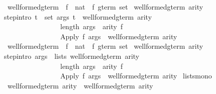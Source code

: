 \begin{isabellebody}
\isanewline
\isamarkupfalse%
\ well{\isacharunderscore}formed{\isacharunderscore}gterm\ {\isacharcolon}{\isacharcolon}\ {\isachardoublequote}{\isacharparenleft}{\isacharprime}f\ {\isasymRightarrow}\ nat{\isacharparenright}\ {\isasymRightarrow}\ {\isacharprime}f\ gterm\ set{\isachardoublequote}\isanewline
\isamarkupfalse%
\ {\isachardoublequote}well{\isacharunderscore}formed{\isacharunderscore}gterm\ arity{\isachardoublequote}\isanewline
{}\isanewline
step{\isacharbrackleft}intro{\isacharbang}{\isacharbrackright}{\isacharcolon}\ {\isachardoublequote}{\isasymlbrakk}{\isasymforall}t\ {\isasymin}\ set\ args{\isachardot}\ t\ {\isasymin}\ well{\isacharunderscore}formed{\isacharunderscore}gterm\ arity{\isacharsemicolon}\ \ \isanewline
\ \ \ \ \ \ \ \ \ \ \ \ \ \ \ \ length\ args\ {\isacharequal}\ arity\ f{\isasymrbrakk}\isanewline
\ \ \ \ \ \ \ \ \ \ \ \ \ \ \ {\isasymLongrightarrow}\ {\isacharparenleft}Apply\ f\ args{\isacharparenright}\ {\isasymin}\ well{\isacharunderscore}formed{\isacharunderscore}gterm\ arity{\isachardoublequote}\isanewline
\isanewline
\isanewline
\isamarkupfalse%
\ well{\isacharunderscore}formed{\isacharunderscore}gterm{\isacharprime}\ {\isacharcolon}{\isacharcolon}\ {\isachardoublequote}{\isacharparenleft}{\isacharprime}f\ {\isasymRightarrow}\ nat{\isacharparenright}\ {\isasymRightarrow}\ {\isacharprime}f\ gterm\ set{\isachardoublequote}\isanewline
\isamarkupfalse%
\ {\isachardoublequote}well{\isacharunderscore}formed{\isacharunderscore}gterm{\isacharprime}\ arity{\isachardoublequote}\isanewline
{}\isanewline
step{\isacharbrackleft}intro{\isacharbang}{\isacharbrackright}{\isacharcolon}\ {\isachardoublequote}{\isasymlbrakk}args\ {\isasymin}\ lists\ {\isacharparenleft}well{\isacharunderscore}formed{\isacharunderscore}gterm{\isacharprime}\ arity{\isacharparenright}{\isacharsemicolon}\ \ \isanewline
\ \ \ \ \ \ \ \ \ \ \ \ \ \ \ \ length\ args\ {\isacharequal}\ arity\ f{\isasymrbrakk}\isanewline
\ \ \ \ \ \ \ \ \ \ \ \ \ \ \ {\isasymLongrightarrow}\ {\isacharparenleft}Apply\ f\ args{\isacharparenright}\ {\isasymin}\ well{\isacharunderscore}formed{\isacharunderscore}gterm{\isacharprime}\ arity{\isachardoublequote}\isanewline
{}\ lists{\isacharunderscore}mono\isanewline
\isanewline
\isamarkupfalse%
\ {\isachardoublequote}well{\isacharunderscore}formed{\isacharunderscore}gterm\ arity\ {\isasymsubseteq}\ well{\isacharunderscore}formed{\isacharunderscore}gterm{\isacharprime}\ arity{\isachardoublequote}\isanewline

\end{isabellebody}
